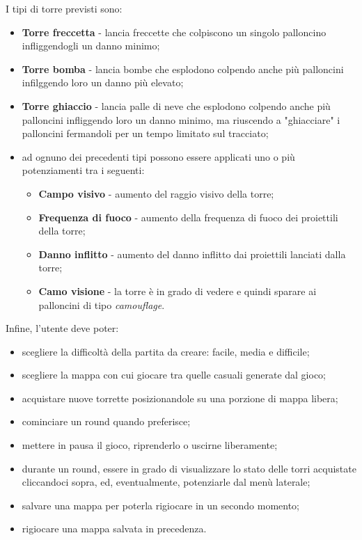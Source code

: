 I tipi di torre previsti sono:
\begin{itemize}
    \item \textbf{Torre freccetta} - lancia freccette che colpiscono un singolo palloncino infliggendogli un danno minimo;
    \item \textbf{Torre bomba} - lancia bombe che esplodono colpendo anche più palloncini infilggendo loro un danno più elevato;
    \item \textbf{Torre ghiaccio} - lancia palle di neve che esplodono colpendo anche più palloncini infliggendo loro un danno minimo, ma riuscendo a "ghiacciare" i palloncini fermandoli per un tempo limitato sul tracciato;
    \item ad ognuno dei precedenti tipi possono essere applicati uno o più potenziamenti tra i seguenti:
    \begin{itemize}
        \item \textbf{Campo visivo} - aumento del raggio visivo della torre;
        \item \textbf{Frequenza di fuoco} - aumento della frequenza di fuoco dei proiettili della torre;
        \item \textbf{Danno inflitto} - aumento del danno inflitto dai proiettili lanciati dalla torre;
        \item \textbf{Camo visione} - la torre è in grado di vedere e quindi sparare ai palloncini di tipo \textit{camouflage}.
    \end{itemize}
\end{itemize}

Infine, l'utente deve poter:
\begin{itemize}
    \item scegliere la difficoltà della partita da creare: facile, media e difficile;
    \item scegliere la mappa con cui giocare tra quelle casuali generate dal gioco;
    \item acquistare nuove torrette posizionandole su una porzione di mappa libera;
    \item cominciare un round quando preferisce;
    \item mettere in pausa il gioco, riprenderlo o uscirne liberamente;
    \item durante un round, essere in grado di visualizzare lo stato delle torri acquistate cliccandoci sopra, ed, eventualmente, potenziarle dal menù laterale;
    \item salvare una mappa per poterla rigiocare in un secondo momento;
    \item rigiocare una mappa salvata in precedenza.
\end{itemize}

